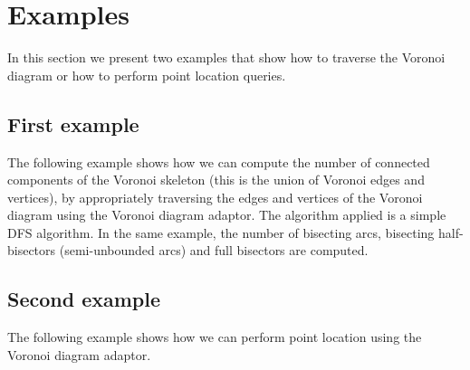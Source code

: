 
\section{Examples}
\label{sec:vda2-examples}

In this section we present two examples that show how to traverse the
Voronoi diagram or how to perform point location queries.

\subsection{First example}

The following example shows how we can compute the number of connected
components of the Voronoi skeleton (this is the union of Voronoi edges
and vertices), by appropriately traversing the edges and vertices of
the Voronoi diagram using the Voronoi diagram adaptor. The algorithm
applied is a simple DFS algorithm. In the same example, the number of
bisecting arcs, bisecting half-bisectors (semi-unbounded arcs) and
full bisectors are computed.


\subsection{Second example}

The following example shows how we can perform point location using
the Voronoi diagram adaptor.

